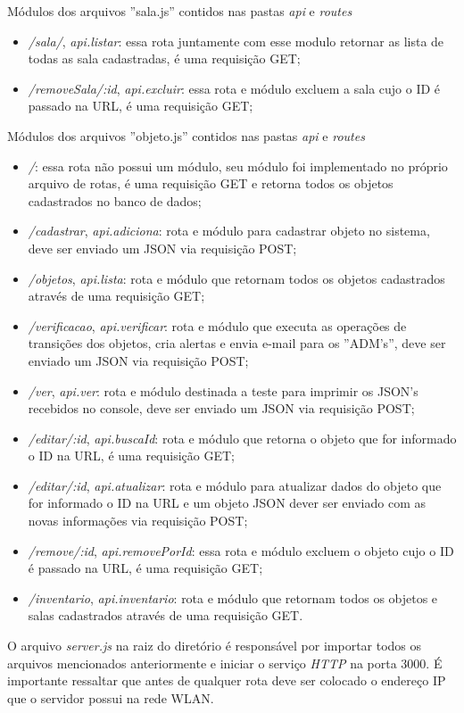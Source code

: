 \par
Módulos dos arquivos ''sala.js'' contidos nas pastas \textit{api} e \textit{routes}
\begin{itemize}
    \item \textit{/sala/}, \textit{api.listar}: essa rota juntamente com esse modulo retornar as lista de todas as sala cadastradas, é uma requisição GET; 

    \item \textit{/removeSala/:id}, \textit{api.excluir}: essa rota e módulo excluem a sala cujo o ID é passado na URL, é uma requisição GET;
\end{itemize}
\par
Módulos dos arquivos ''objeto.js'' contidos nas pastas \textit{api} e \textit{routes}
\begin{itemize}
    \item  \textit{/}: essa rota não possui um módulo, seu módulo foi implementado no próprio arquivo de rotas, é uma requisição GET e retorna todos os objetos cadastrados no banco de dados;

    \item \textit{/cadastrar}, \textit{api.adiciona}: rota e módulo para cadastrar objeto no sistema, deve ser enviado um JSON via requisição POST;

    \item \textit{/objetos}, \textit{api.lista}: rota e módulo que retornam todos os objetos cadastrados através de uma requisição GET;

    \item \textit{/verificacao}, \textit{api.verificar}: rota e módulo que executa as operações de transições dos objetos, cria alertas e envia e-mail para os ''ADM's'', deve ser enviado um JSON via requisição POST;

    \item \textit{/ver}, \textit{api.ver}: rota e módulo destinada a teste para imprimir os JSON's recebidos no console, deve ser enviado um JSON via requisição POST;

    \item \textit{/editar/:id}, \textit{api.buscaId}: rota e módulo que retorna o  objeto que for informado o ID na URL, é uma requisição GET;

    \item \textit{/editar/:id}, \textit{api.atualizar}: rota e módulo para atualizar dados do objeto que for informado o ID na URL e um objeto JSON dever ser enviado com as novas informações via requisição POST;

    \item \textit{/remove/:id}, \textit{api.removePorId}: essa rota e módulo excluem o objeto cujo o ID é passado na URL, é uma requisição GET;
    
    \item \textit{/inventario}, \textit{api.inventario}: rota e módulo que retornam todos os objetos e salas cadastrados através de uma requisição GET.

\end{itemize}
\par 
O arquivo \textit{server.js} na raiz do diretório é responsável por importar todos os arquivos mencionados anteriormente e iniciar o serviço \textit{HTTP} na porta $3000$. É importante ressaltar que antes de qualquer rota deve ser colocado o endereço IP que o servidor possui na rede WLAN.